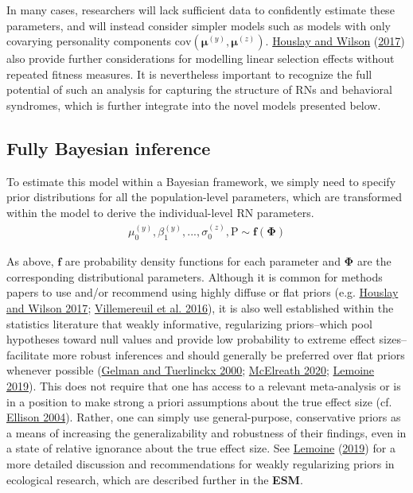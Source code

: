 \documentclass{article}
\begin{document}
In many cases, researchers will lack sufficient data to confidently
estimate these parameters, and will instead consider simpler models such
as models with only covarying personality components
\(\mathrm{cov} (\boldsymbol{\mu}^{(y)}, \boldsymbol{\mu}^{(z)} )\).
\protect\hyperlink{ref-Hous2017}{Houslay and Wilson}
(\protect\hyperlink{ref-Hous2017}{2017}) also provide further
considerations for modelling linear selection effects without repeated
fitness measures. It is nevertheless important to recognize the full
potential of such an analysis for capturing the structure of RNs and
behavioral syndromes, which is further integrate into the novel models
presented below.

\hypertarget{fully-bayesian-inference}{%
\subsection{Fully Bayesian inference}\label{fully-bayesian-inference}}

To estimate this model within a Bayesian framework, we simply need to
specify prior distributions for all the population-level parameters,
which are transformed within the model to derive the individual-level RN
parameters. \begin{align} \tag{1.3}\label{eq:1.3}
\mu_0^{(y)},\beta_1^{(y)},...,\sigma_0^{(z)},\boldsymbol{\mathrm{P}} \sim \boldsymbol{f}(\boldsymbol{\Phi})
\end{align}

As above, \(\boldsymbol{f}\) are probability density functions for each
parameter and \(\boldsymbol{\Phi}\) are the corresponding distributional
parameters. Although it is common for methods papers to use and/or
recommend using highly diffuse or flat priors (e.g.
\protect\hyperlink{ref-Hous2017}{Houslay and Wilson 2017};
\protect\hyperlink{ref-Vill2016}{Villemereuil et al. 2016}), it is also
well established within the statistics literature that weakly
informative, regularizing priors--which pool hypotheses toward null
values and provide low probability to extreme effect sizes--facilitate
more robust inferences and should generally be preferred over flat
priors whenever possible (\protect\hyperlink{ref-Gelman2000}{Gelman and
Tuerlinckx 2000}; \protect\hyperlink{ref-Rethinking}{McElreath 2020};
\protect\hyperlink{ref-Lemoine2019}{Lemoine 2019}). This does not
require that one has access to a relevant meta-analysis or is in a
position to make strong a priori assumptions about the true effect size
(cf. \protect\hyperlink{ref-Ellison2004}{Ellison 2004}). Rather, one can
simply use general-purpose, conservative priors as a means of increasing
the generalizability and robustness of their findings, even in a state
of relative ignorance about the true effect size. See
\protect\hyperlink{ref-Lemoine2019}{Lemoine}
(\protect\hyperlink{ref-Lemoine2019}{2019}) for a more detailed
discussion and recommendations for weakly regularizing priors in
ecological research, which are described further in the \textbf{ESM}.
\end{document}
